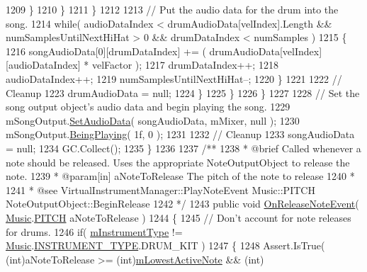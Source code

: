 \begin{DoxyCodeInclude}
1209                             \}
1210                         \}
1211                     \}
1212 
1213                     \textcolor{comment}{// Put the audio data for the drum into the song.}
1214                     \textcolor{keywordflow}{while}( audioDataIndex < drumAudioData[velIndex].Length && numSamplesUntilNextHiHat > 0 
      && drumDataIndex < numSamples )
1215                     \{
1216                         songAudioData[0][drumDataIndex] += ( drumAudioData[velIndex][audioDataIndex] * 
      velFactor );
1217                         drumDataIndex++;
1218                         audioDataIndex++;
1219                         numSamplesUntilNextHiHat--;
1220                     \}
1221 
1222                     \textcolor{comment}{// Cleanup}
1223                     drumAudioData = null;
1224                 \}
1225             \}
1226         \}
1227 
1228         \textcolor{comment}{// Set the song output object's audio data and begin playing the song.}
1229         mSongOutput.\hyperlink{group___n_o_o_pub_func_gaef9ab691f0a2671a62249d853f24162d}{SetAudioData}( songAudioData, mMixer, null );
1230         mSongOutput.\hyperlink{group___n_o_o_pub_func_ga2bdaa2787408f353f71ef6c6a18e9285}{BeingPlaying}( 1f, 0 );
1231 
1232         \textcolor{comment}{// Cleanup}
1233         songAudioData = null;
1234         GC.Collect();
1235     \}
1236 \textcolor{comment}{}
1237 \textcolor{comment}{    /**}
1238 \textcolor{comment}{     * @brief Called whenever a note should be released. Uses the appropriate NoteOutputObject to release
       the note.}
1239 \textcolor{comment}{     * @param[in] aNoteToRelease The pitch of the note to release}
1240 \textcolor{comment}{     * }
1241 \textcolor{comment}{     * @see VirtualInstrumentManager::PlayNoteEvent Music::PITCH NoteOutputObject::BeginRelease}
1242 \textcolor{comment}{    */}
1243     \textcolor{keyword}{public} \textcolor{keywordtype}{void} \hyperlink{group___v_i_m_handlers_ga0f0a34c251d154131f9ea130a54dc989}{OnReleaseNoteEvent}( \hyperlink{class_music}{Music}.\hyperlink{group___music_enums_ga508f69b199ea518f935486c990edac1d}{PITCH} aNoteToRelease )
1244     \{
1245         \textcolor{comment}{// Don't account for note releases for drums.}
1246         \textcolor{keywordflow}{if}( \hyperlink{group___v_i_m_priv_ga108c350257b3a2080e06cd4a8251f6a4}{mInstrumentType} != \hyperlink{class_music}{Music}.\hyperlink{group___music_enums_gabfce60192305965558a36e368ebd67c3}{INSTRUMENT\_TYPE}.DRUM\_KIT )
1247         \{
1248             Assert.IsTrue( (\textcolor{keywordtype}{int})aNoteToRelease >= (\textcolor{keywordtype}{int})\hyperlink{group___v_i_m_priv_ga5e3a5116e0dabb37e0ea21d73ac1567e}{mLowestActiveNote} && (\textcolor{keywordtype}{int})

\end{DoxyCodeInclude}
